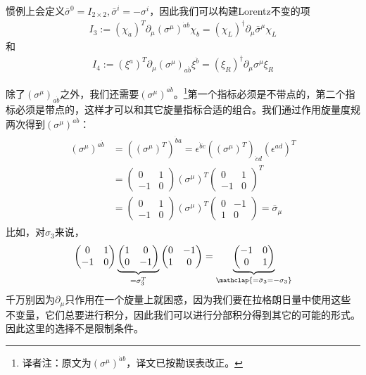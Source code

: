 惯例上会定义$\bar\sigma^0=I_{2\times2},\bar\sigma^i=-\sigma^i$，因此我们可以构建Lorentz不变的项
\begin{align}
\label{equ6.10}
I_3:=(\chi_{\dot{a}})^T\partial_\mu(\sigma^\mu)^{\dot{a}b}\chi_b=(\chi_L)^\dagger\partial_\mu\bar\sigma^\mu\chi_L
\end{align}
和
\begin{align}
\label{equ6.11}
I_4:=(\xi^a)^T\partial_\mu(\sigma^\mu)_{a\dot{b}}\xi^{\dot{b}}=(\xi_R)^\dagger\partial_\mu\sigma^\mu\xi_R
\end{align}

除了$(\sigma^\mu)_{a\dot{b}}$之外，我们还需要$(\sigma^\mu)^{a \dot{b}}$。\footnote{译者注：原文为$(\sigma^\mu)^{\dot{a} b}$，译文已按勘误表改正。}第一个指标必须是不带点的，第二个指标必须是带点的，这样才可以和其它旋量指标合适的组合。我们通过作用旋量度规两次得到$(\sigma^\mu)^{a\dot{b}}$：
\begin{align}
\label{equ6.12}
\begin{split}
(\sigma^\mu)^{a\dot{b}}&=((\sigma^\mu)^T)^{\dot{b}a}=\epsilon^{\dot{b}\dot{c}}((\sigma^\mu)^T)_{\dot{c}d}(\epsilon^{ad})^T\\
&=\begin{pmatrix}0&1\\-1&0\end{pmatrix}(\sigma^\mu)^T\begin{pmatrix}0&1\\-1&0\end{pmatrix}^T\\
&=\begin{pmatrix}0&1\\-1&0\end{pmatrix}(\sigma^\mu)^T\begin{pmatrix}0&-1\\1&0\end{pmatrix}=\bar\sigma_\mu
\end{split}\end{align}
比如，对$\sigma_3$来说，
\[\begin{pmatrix}0&1\\-1&0\end{pmatrix}\underbrace{\begin{pmatrix}1&0\\0&-1\end{pmatrix}}_{=\sigma_3^T}\begin{pmatrix}0&-1\\1&0\end{pmatrix}=\underbrace{\begin{pmatrix}-1&0\\0&1\end{pmatrix}}_{\mathclap{=\bar\sigma_3=-\sigma_3}} \]
千万别因为$\partial_\mu$只作用在一个旋量上就困惑，因为我们要在拉格朗日量中使用这些不变量，它们总要进行积分，因此我们可以进行分部积分得到其它的可能的形式。因此这里的选择不是限制条件。


